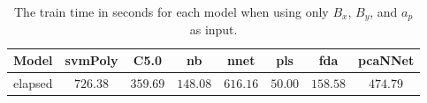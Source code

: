 \begin{table}[!ht]
	\centering
	\begin{tabular}{|c|c|c|c|c|c|c|c|}
		\hline
		Model & svmPoly & C5.0 & nb & nnet & pls & fda & pcaNNet \\ \hline
		elapsed & $726.38$ & $359.69$ & $148.08$ & $616.16$ & $50.00$ & $158.58$ & $474.79$ \\ \hline
	\end{tabular}
	\caption{The train time in seconds for each model when using only $B_{x}$, $B_{y}$, and $a_{p}$ as input.}
	\label{tab:time:reverse:xyap:train}
\end{table}
